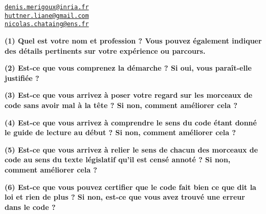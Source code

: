 \documentclass[12pt, french]{article}
\begin{document}
\begin{center}
  \href{mailto:denis.merigoux@inria.fr}{\texttt{denis.merigoux@inria.fr}}\\[0.5em]
  \href{mailto:huttner.liane@gmail.com}{\texttt{huttner.liane@gmail.com}}\\[0.5em]
  \href{mailto:nicolas.chataing@ens.fr}{\texttt{nicolas.chataing@ens.fr}}
\end{center}

\clearpage

\label{form}
\begin{Form}
  \begin{center}
    \small
  \textbf{(1) Quel est votre nom et profession ? Vous pouvez également indiquer des détails pertinents sur votre expérience ou parcours.}\\[1em]

    \TextField[multiline=true, width=\textwidth]{}
  \end{center}
  \begin{center}
  \textbf{(2) Est-ce que vous comprenez la démarche ? Si oui, vous paraît-elle justifiée ?}\\[1em]

    \TextField[multiline=true, width=\textwidth]{}
  \end{center}
  \begin{center}
  \textbf{(3) Est-ce que vous arrivez à poser votre regard sur les morceaux de code sans avoir mal à la tête ? Si non, comment améliorer cela ?}\\[1em]

    \TextField[multiline=true, width=\textwidth]{}
  \end{center}
  \begin{center}
  \textbf{(4) Est-ce que vous arrivez à comprendre le sens du code étant donné le guide de lecture au début ? Si non, comment améliorer cela ?}\\[1em]

    \TextField[multiline=true, width=\textwidth]{}
  \end{center}
  \begin{center}
  \textbf{(5) Est-ce que vous arrivez à relier le sens de chacun des morceaux de code au sens du texte législatif qu'il est censé annoté ? Si non, comment améliorer cela ?}\\[1em]

    \TextField[multiline=true, width=\textwidth]{}
  \end{center}
  \begin{center}
  \textbf{(6) Est-ce que vous pouvez certifier que le code fait bien ce que dit la loi et rien de plus ? Si non, est-ce que vous avez trouvé une erreur dans le code ? }\\[1em]

    \TextField[multiline=true, width=\textwidth]{}
  \end{center}
\end{Form}
\end{document}
